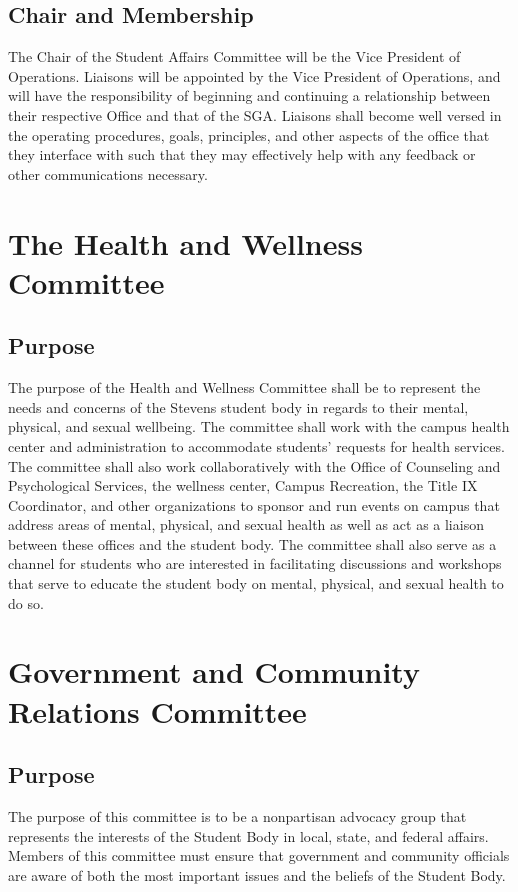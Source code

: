 \documentclass[12pt]{scrreprt}
\begin{document}
\subsection{Chair and Membership}
The Chair of the Student Affairs Committee will be the Vice President of Operations.
Liaisons will be appointed by the Vice President of Operations, and will have the responsibility of beginning and continuing a relationship between their respective Office and that of the SGA. Liaisons shall become well versed in the operating procedures, goals, principles, and other aspects of the office that they interface with such that they may effectively help with any feedback or other communications necessary.

\section{The Health and Wellness Committee}

\subsection{Purpose}
The purpose of the Health and Wellness Committee shall be to represent the needs and
concerns of the Stevens student body in regards to their mental, physical, and sexual
wellbeing. The committee shall work with the campus health center and administration to
accommodate students’ requests for health services. The committee shall also work
collaboratively with the Office of Counseling and Psychological Services, the wellness
center, Campus Recreation, the Title IX Coordinator, and other organizations to sponsor
and run events on campus that address areas of mental, physical, and sexual health as
well as act as a liaison between these offices and the student body. The committee shall also serve as a channel for students who are interested in facilitating discussions and workshops that serve to educate the student body on mental, physical, and sexual health to do so. 
\section{Government and Community Relations Committee}
\subsection{Purpose}
The purpose of this committee is to be a nonpartisan advocacy group that represents
the interests of the Student Body in local, state, and federal affairs. Members of this
committee must ensure that government and community officials are aware of both the
most important issues and the beliefs of the Student Body.
\end{document}
